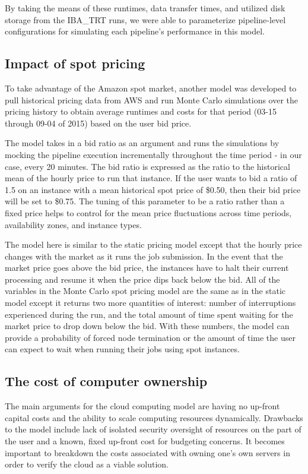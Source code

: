 \documentclass{frontiersSCNS} %
\begin{document}
By taking the means of these runtimes, data transfer times, and utilized disk storage from the IBA\_TRT runs, we were able to parameterize pipeline-level configurations for simulating each pipeline's performance in this model.

\subsection{Impact of spot pricing}
To take advantage of the Amazon spot market, another model was developed to pull historical pricing data from AWS and run Monte Carlo simulations over the pricing history to obtain average runtimes and costs for that period (03-15 through 09-04 of 2015) based on the user bid price.

The model takes in a bid ratio as an argument and runs the simulations by mocking the pipeline execution incrementally throughout the time period - in our case, every 20 minutes. The bid ratio is expressed as the ratio to the historical mean of the hourly price to run that instance. If the user wants to bid a ratio of 1.5 on an instance with a mean historical spot price of \$0.50, then their bid price will be set to \$0.75. The tuning of this parameter to be a ratio rather than a fixed price helps to control for the mean price fluctuations across time periods, availability zones, and instance types.

The model here is similar to the static pricing model except that the hourly price changes with the market as it runs the job submission. In the event that the market price goes above the bid price, the instances have to halt their current processing and resume it when the price dips back below the bid. All of the variables in the Monte Carlo spot pricing model are the same as in the static model except it returns two more quantities of interest: number of interruptions experienced during the run, and the total amount of time spent waiting for the market price to drop down below the bid. With these numbers, the model can provide a probability of forced node termination or the amount of time the user can expect to wait when running their jobs using spot instances.

\subsection{The cost of computer ownership}
The main arguments for the cloud computing model are having no up-front capital costs and the ability to scale computing resources dynamically. Drawbacks to the model include lack of isolated security oversight of resources on the part of the user and a known, fixed up-front cost for budgeting concerns. It becomes important to breakdown the costs associated with owning one’s own servers in order to verify the cloud as a viable solution.
\end{document}
